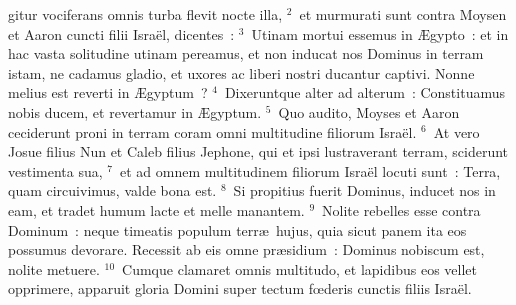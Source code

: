 \bchapter
{}gitur vociferans omnis turba flevit nocte illa,
${}^{2}$~et murmurati sunt contra Moysen et Aaron cuncti filii Isra\"el, dicentes~:
${}^{3}$~Utinam mortui essemus in \AE gypto~: et in hac vasta solitudine utinam pereamus, et non inducat nos Dominus in terram istam, ne cadamus gladio, et uxores ac liberi nostri ducantur captivi. Nonne melius est reverti in \AE gyptum~?
${}^{4}$~Dixeruntque alter ad alterum~: Constituamus nobis ducem, et revertamur in \AE gyptum.
${}^{5}$~Quo audito, Moyses et Aaron ceciderunt proni in terram coram omni multitudine filiorum Isra\"el.
${}^{6}$~At vero Josue filius Nun et Caleb filius Jephone, qui et ipsi lustraverant terram, sciderunt vestimenta sua,
${}^{7}$~et ad omnem multitudinem filiorum Isra\"el locuti sunt~: Terra, quam circuivimus, valde bona est.
${}^{8}$~Si propitius fuerit Dominus, inducet nos in eam, et tradet humum lacte et melle manantem.
${}^{9}$~Nolite rebelles esse contra Dominum~: neque timeatis populum terr\ae\ hujus, quia sicut panem ita eos possumus devorare. Recessit ab eis omne pr\ae sidium~: Dominus nobiscum est, nolite metuere.
${}^{10}$~Cumque clamaret omnis multitudo, et lapidibus eos vellet opprimere, apparuit gloria Domini super tectum fœderis cunctis filiis Isra\"el.


